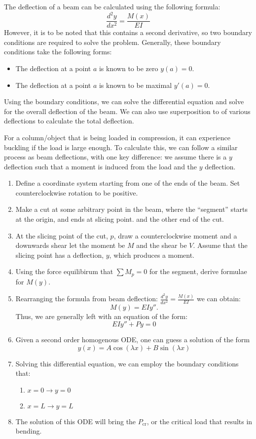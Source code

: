 \documentclass{article}
\begin{document}
The deflection of a beam can be calculated using the following formula:
\[
    \frac{d^2y}{dx^2} = \frac{M(x)}{EI}    
\]
However, it is to be noted that this contains a second derivative, so two boundary
conditions are required to solve the problem. Generally, these boundary conditions take
the following forms:
\begin{itemize}
    \item The deflection at a point $a$ is known to be zero $y(a) = 0$.
    \item The deflection at a point $a$ is known to be maximal $y'(a) = 0$.
\end{itemize}

Using the boundary conditions, we can solve the differential equation and solve for
the overall deflection of the beam.
\gap
We can also use superposition to of various deflections to calculate the total deflection.
\gap
{}

For a column/object that is being loaded in compression, it can experience buckling
if the load is large enough. To calculate this, we can follow a similar process as 
beam deflections, with one key difference: we assume there is a $y$ deflection 
such that a moment is induced from the load and the $y$ deflection.

\begin{enumerate}
    \item Define a coordinate system starting from one of the ends of the beam. Set counterclockwise
    rotation to be positive. 
    \item Make a cut at some arbitrary point in the beam, where the ``segment'' starts
    at the origin, and ends at slicing point.
    and the other end of the cut.
    \item At the slicing point of the cut, $p$, draw a counterclockwise moment and a downwards shear
    let the moment be $M$ and the shear be $V$. Assume that the slicing point has 
    a deflection, $y$, which produces a moment.
    \item Using the force equilibirum that $\sum M_p = 0$ for the 
    segment, derive formulae for $M(y)$.
    \item Rearranging the formula from beam deflection: $\frac{d^2y}{dx^2} = \frac{M(x)}{EI}$
    we can obtain:
    \[
        M(y) = EIy''.
    \]
    Thus, we are generally left with an equation of the form:
    \[
        EIy'' + Py = 0
    \]
    \item Given a second order homogenous ODE, one can guess a solution of the form 
    \[
        y(x) = A\cos(\lambda x) + B\sin(\lambda x)
    \]
    \item Solving this differential equation, we can employ the boundary conditions that:
    \begin{enumerate}
        \item $x = 0 \to y = 0$
        \item $x = L \to y = L$
    \end{enumerate}
    \item The solution of this ODE will bring the $P_{\textrm{cr}}$, or the critical
    load that results in bending.
\end{enumerate}
\end{document}
